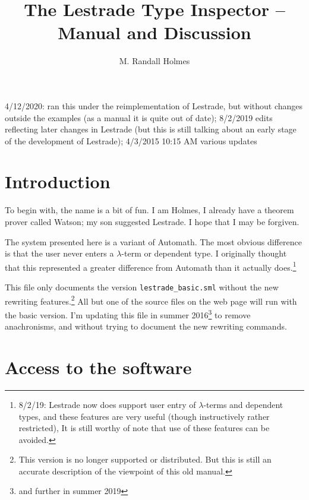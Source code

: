 


\title{The Lestrade Type Inspector -- Manual and Discussion}

\author{M. Randall Holmes}



\maketitle

 4/12/2020:  ran this under the reimplementation of Lestrade, but without changes outside the examples (as a manual it is quite out of date);  8/2/2019 edits reflecting later changes in Lestrade (but this is still talking about an early stage of the development of Lestrade); 4/3/2015 10:15 AM various updates

\tableofcontents

\section{Introduction}

To begin with, the name is a bit of fun.  I am Holmes, I already have a theorem prover called Watson; my son suggested Lestrade.  I hope that I may be forgiven.

The system presented here is a variant of Automath.  The most obvious difference is that the user never enters a $\lambda$-term or dependent type.  I originally thought that this represented a greater difference from Automath than it actually does.\footnote{8/2/19:  Lestrade now does support user entry of $\lambda$-terms and dependent types, and these features are very useful (though instructively rather restricted),  It is still worthy of note that use of these features can be avoided.}

This file only documents the version {\tt lestrade\_basic.sml} without the new rewriting features.\footnote{This version is no longer supported or distributed.  But this is still an accurate description of the viewpoint of this old manual.}  All but one of the source files on the web page will run with the basic version.  I'm updating this file in summer 2016\footnote{and further in summer 2019} to remove anachronisms, and without trying to document the new rewriting commands.

\section{Access to the software}

